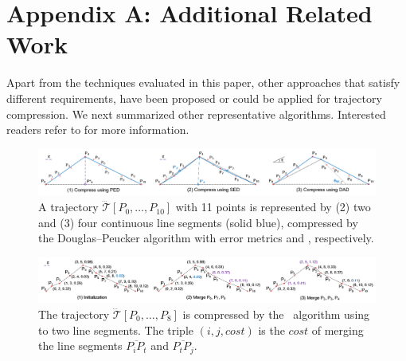 \section*{Appendix A: Additional Related Work}
Apart from the techniques evaluated in this paper, other approaches that satisfy different requirements, have been proposed or could be applied for trajectory compression.
We next summarized other representative \lsa algorithms. Interested readers refer to \cite{Shi:Survey, Muckell:Compression, Lin:Cised, Zhang:Evaluation} for more information. %

\begin{figure}[tb!]
	\centering
	\includegraphics[scale=0.60]{Figures/Fig-DP.png}
	\vspace{-5ex}
	\caption{\small A trajectory $\dddot{\mathcal{T}}[P_0, \ldots, P_{10}]$  with 11 points is represented by (2) two and (3) four continuous line segments (solid blue), compressed by the Douglas--Peucker algorithm \cite{Douglas:Peucker} with error metrics \ped and \sed, respectively.}
	\vspace{-0ex}
	\label{fig:notations}
\end{figure}

\begin{figure}[tb!]
	\centering
	\includegraphics[scale=0.55]{Figures/Fig-Pavlidis.png}
	\vspace{-5ex}
	\caption{\small The trajectory $\dddot{\mathcal{T}}[P_0, \ldots, P_{8}]$ is compressed by the \pavlidis~algorithm using \ped to two line segments. The triple $(i, j, cost)$ is the $cost$ of merging the line segments $\overline{P_iP_t}$ and $\overline{P_tP_j}$.} %
	\vspace{-0ex}
	\label{fig:pavlidis}
\end{figure}




